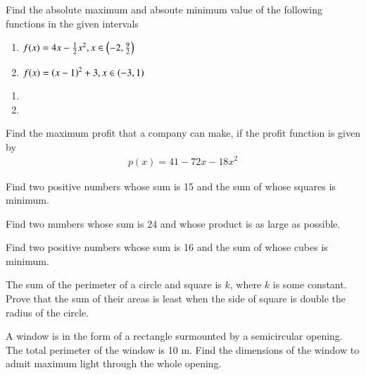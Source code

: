%

\item Find the absolute maximum and absoute minimum value of the following functions in the given intervals
%
\begin{enumerate}
\item $f(x) = 4x - \frac{1}{2}x^2, x \in \left(-2,\frac{9}{2}\right)$
\item $f(x) = \left(x-1\right)^2 + 3,  x \in \left(-3,1\right)$
\end{enumerate}
%
\solution
\begin{enumerate}
    \item  
    \item  

\end{enumerate}
\item Find the maximum profit that a company can make, if the profit function is given by
\begin{align}
p(x) = 41-72x - 18x^2
\end{align}
%
\item Find two positive numbers whose sum is 15 and the sum of whose squares is minimum.
\item Find two numbers whose sum is 24 and whose product is as large as possible.
\item Find two positive numbers whose sum is 16 and the sum of whose cubes is minimum.
\item The sum of the perimeter of a circle and square is $k$, where $k$ is some constant. Prove that the sum of their areas is least when the side of square is double the radius of the circle.
\item A window is in the form of a rectangle surmounted by a semicircular opening. The total perimeter of the window is 10 m. Find the dimensions of the window to admit maximum light through the whole opening.

